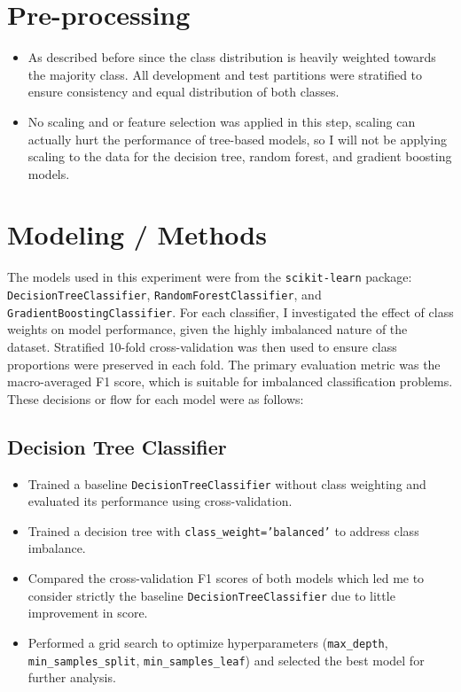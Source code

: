 \documentclass[12pt]{article}
\begin{document}
\section{Pre-processing}
\begin{itemize}
    \item As described before since the class distribution is heavily weighted towards the majority class. All development and test partitions were stratified to ensure consistency and equal distribution of both classes.
    \item No scaling and or feature selection was applied in this step, scaling can actually hurt the performance of tree-based models, so I will not be applying scaling to the data for the decision tree, random forest, and gradient boosting models.
\end{itemize}

\section{Modeling / Methods}

The models used in this experiment were from the \texttt{scikit-learn} package: \texttt{DecisionTreeClassifier}, \texttt{RandomForestClassifier}, and \texttt{GradientBoostingClassifier}. For each classifier, I investigated the effect of class weights on model performance, given the highly imbalanced nature of the dataset. Stratified 10-fold cross-validation was then used to ensure class proportions were preserved in each fold. The primary evaluation metric was the macro-averaged F1 score, which is suitable for imbalanced classification problems. These decisions or flow for each model were as follows:

\subsection{Decision Tree Classifier}
\begin{itemize}
    \item Trained a baseline \texttt{DecisionTreeClassifier} without class weighting and evaluated its performance using cross-validation.
    \item Trained a decision tree with \texttt{class\_weight='balanced'} to address class imbalance.
    \item Compared the cross-validation F1 scores of both models which led me to consider strictly the baseline \texttt{DecisionTreeClassifier} due to little improvement in score.
    \item Performed a grid search to optimize hyperparameters (\texttt{max\_depth}, \texttt{min\_samples\_split}, \texttt{min\_samples\_leaf}) and selected the best model for further analysis.
\end{itemize}
\end{document}
